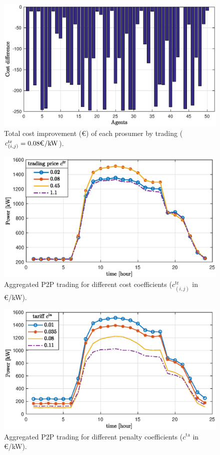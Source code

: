 \documentclass{IEEEtran}  %
\newcommand{\0}{\mathbf{0}}
\newcommand{\1}{\mathbf{1}}
\begin{document}
%	
\begin{figure}[htbp]
	\centering
	\includegraphics[width=.92\linewidth]{figures/b0.eps}
	\caption{Total cost improvement (\euro) of each prosumer by trading ($c_{(i,j)}^{\mathrm{tr}}=0.08\text{\euro/kW}$).
	}
	\label{fig:simC_cost}
\end{figure}
%
\begin{figure}[htbp]
	\centering
	\includegraphics[width=.92\linewidth]{figures/b1a.eps}
	\caption{Aggregated P2P trading for different cost coefficients ($c_{(i,j)}^{\mathrm{tr}}$ in \euro/kW).
	}
	\label{fig:simC_ctr}
\end{figure}
%
\begin{figure}[t!]
	\centering
	\includegraphics[width=.92\linewidth]{figures/b2a.eps}
	\caption{Aggregated P2P trading for different penalty coefficients ($c^{\mathrm{ta}}$ in \euro/kW).
	}
	\label{fig:simC_pen}
\end{figure}
\end{document}
